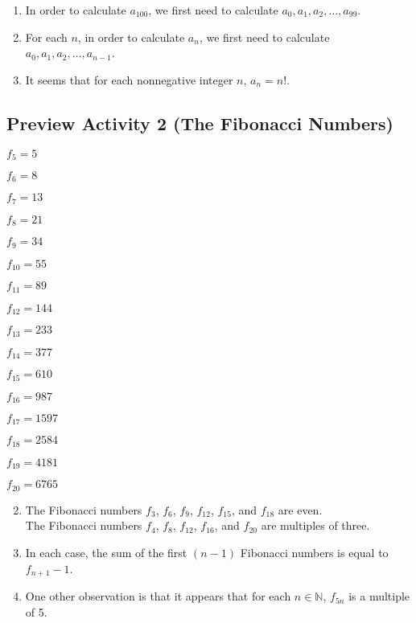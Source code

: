 \begin{enumerate}
\item In order to calculate  $a_{100} $, we first need to calculate  
$a_0 , a_1 , a_2 ,  \ldots , a_{99} $.

\item For each  $n$,  in order to calculate  $a_n $, we first need to calculate  
$a_0 , a_1 , a_2 , \ldots , a_{n - 1} $.

\item It seems that for each nonnegative integer  $n$,  $a_n  = n!$.

\end{enumerate}
\hbreak


\subsection*{Preview Activity 2 (The Fibonacci Numbers)}
\begin{multicols}{4}
$f_5  = 5$

$f_6  = 8$

$f_7  = 13$

$f_8  = 21$

$f_9  = 34$

$f_{10}  = 55$

$f_{11}  = 89$

$f_{12}  = 144$

$f_{13}  = 233$

$f_{14}  = 377$

$f_{15}  = 610$

$f_{16}  = 987$

$f_{17}  = 1597$

$f_{18}  = 2584$

$f_{19}  = 4181$

$f_{20}  = 6765$

%
%
%
\end{multicols}

\begin{enumerate} \setcounter{enumi}{1}
\item  The Fibonacci numbers $f_3$, $f_6$, $f_9$, $f_{12}$, $f_{15}$, and $f_{18}$ are even.  \\
The Fibonacci numbers $f_4$, $f_8$, $f_{12}$, $f_{16}$, and $f_{20}$ are multiples of three.

\item In each case, the sum of the first $(n - 1)$ Fibonacci numbers is equal to $f_{n+1} - 1$.
\item One other observation is that it appears that for each  $n \in \mathbb{N}$,  $f_{5n} $  is a multiple of 5.
\end{enumerate}
\hbreak


\newpage

\endinput
